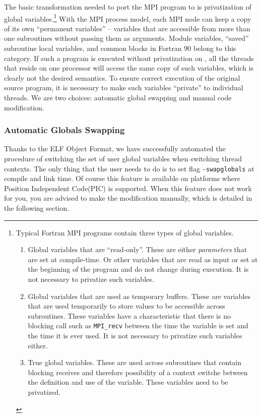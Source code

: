 \documentclass[10pt]{article}
\begin{document}
The basic transformation needed to port the MPI program to \ampi{} is
privatization of global variables.\footnote{Typical Fortran MPI programs
contain three types of global variables.

\begin{enumerate}

\item Global variables that are ``read-only''. These are either
\emph{parameters} that are set at compile-time. Or other variables that are
read as input or set at the beginning of the program and do not change during
execution. It is not necessary to privatize such variables.

\item Global variables that are used as temporary buffers. These are variables
that are used temporarily to store values to be accessible across subroutines.
These variables have a characteristic that there is no blocking call such as
\texttt{MPI\_recv} between the time the variable is set and the time it is ever
used. It is not necessary to privatize such variables either. 

\item True global variables. These are used across subroutines that contain
blocking receives and therefore possibility of a context switche between the
definition and use of the variable. These variables need to be privatized.

\end{enumerate}
}
With the MPI process model, each MPI node can keep a copy of its own
``permanent variables'' -- variables that are accessible from more than one
subroutines without passing them as arguments.  Module variables, ``saved''
subroutine local variables, and common blocks in Fortran 90 belong to this
category. If such a program is executed without privatization on \ampi{}, all
the \ampi{} threads that reside on one processor will access the same copy of
such variables, which is clearly not the desired semantics.  To ensure correct
execution of the original source program, it is necessary to make such
variables ``private'' to individual threads. We are two choices: automatic 
global swapping and manual code modification.

\subsubsection{Automatic Globals Swapping}
Thanks to the ELF Object Format, we have successfully automated the procedure 
of switching the set of user global variables when switching thread contexts. 
The only thing that the user needs to do is to set flag {\tt -swapglobals} 
at compile and link time. Of course this feature is available on platforms where Position
Independent Code(PIC) is supported. When this feature does not work for you,
you are advised to make the modification manually, which is detailed in the
following section.
\end{document}
